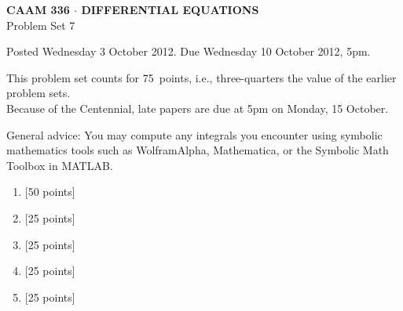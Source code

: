 \documentclass[10pt]{article}
\begin{document}

\begin{center}
\large \textsf{\textbf{CAAM 336 $\cdot$ DIFFERENTIAL EQUATIONS}\\[0.5em]
 Problem Set 7 }
\end{center}

Posted Wednesday 3 October 2012.  Due Wednesday 10 October 2012, 5pm.



\begin{center}
This problem set counts for 75~points, i.e., three-quarters the value 
of the earlier problem sets.\\
Because of the Centennial, late papers are due at 5pm on Monday, 15 October.
\end{center}

General advice: You may compute any integrals you encounter using symbolic mathematics 
tools such as WolframAlpha, Mathematica, or the Symbolic Math Toolbox in MATLAB.


\begin{enumerate}
\item {[50 points]}\\  

\vspace*{1em}
\item {[25 points]}\\  

\item {[25 points]}\\  

\item {[25 points]}\\  

\item {[25 points]}\\  
\end{enumerate}
\end{document}
